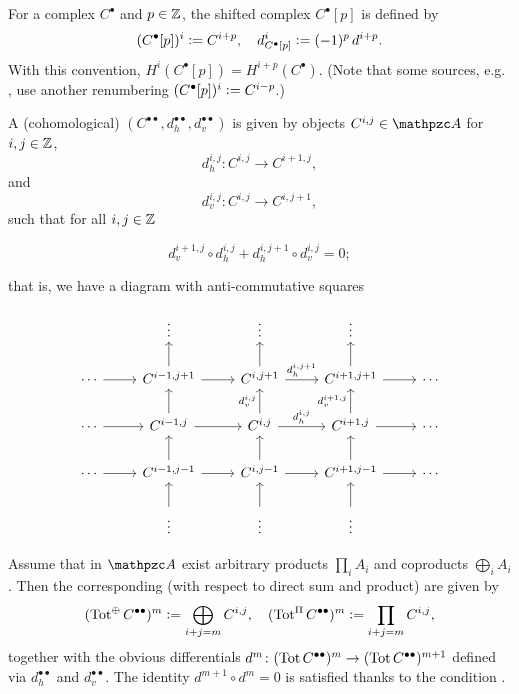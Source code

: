 For a complex $C^\bullet$ and $p\in\mathbb{Z}$, the shifted complex $C^\bullet [p]$ is
defined by
$$(C^\bullet [p])^i \mathrel{\mathop:}= C^{i+p}, \quad d^i_{C^\bullet [p]} \mathrel{\mathop:}= (-1)^p \, d^{i+p}.$$
With this convention, $H^i (C^\bullet [p]) = H^{i+p} (C^\bullet)$. (Note that
some sources, e.g. \cite[1.2.4]{Weibel-94}, use another renumbering
$(C^\bullet [p])^i \mathrel{\mathop:}= C^{i-p}$.)

\begin{definition}
  \label{dfn:double-complex}
  A (cohomological) 
  $(C^{\bullet\bullet}, d_h^{\bullet\bullet}, d_v^{\bullet\bullet})$ is given by
  objects $C^{i,j}\in \vcateg{A}$ for $i,j\in\mathbb{Z}$,
  $$d_h^{i,j}\colon C^{i,j}\to C^{i+1,j},$$
  and 
  $$d_v^{i,j}\colon C^{i,j}\to C^{i,j+1},$$
  such that for all $i,j\in\mathbb{Z}$

  \begin{equation}
    \label{eqn:anticommutativity-in-double-complex}
    d_v^{i+1,j}\circ d_h^{i,j} + d_h^{i,j+1}\circ d_v^{i,j} = 0;
  \end{equation}

  \noindent that is, we have a diagram with anti-commutative squares

  \[ \begin{tikzcd}
      & \vdots & \vdots & \vdots \\
      \cdots\ar{r} & C^{i-1,j+1}\ar{r}\ar{u} & C^{i,j+1}\ar{r}{d_h^{i,j+1}}\ar{u} & C^{i+1,j+1}\ar{r}\ar{u} & \cdots \\
      \cdots\ar{r} & C^{i-1,j}\ar{r}\ar{u} & C^{i,j}\ar{r}{d_h^{i,j}}\ar{u}{d_v^{i,j}} & C^{i+1,j}\ar{r}\ar{u}{d_v^{i+1,j}} & \cdots \\
      \cdots\ar{r} & C^{i-1,j-1}\ar{r}\ar{u} & C^{i,j-1}\ar{r}\ar{u} & C^{i+1,j-1}\ar{r}\ar{u} & \cdots \\
      & \vdots\ar{u} & \vdots\ar{u} & \vdots\ar{u}
    \end{tikzcd} \]

  Assume that in $\vcateg{A}$ exist arbitrary products $\prod_i A_i$ and
  coproducts $\bigoplus_i A_i$. Then the corresponding 
  (with respect to direct sum and product) are given by
  \[ (\operatorname{Tot}^\oplus C^{\bullet\bullet})^m \mathrel{\mathop:}= \bigoplus_{i+j = m} C^{i,j},
    \quad
    (\operatorname{Tot}^\Pi C^{\bullet\bullet})^m \mathrel{\mathop:}= \prod_{i+j = m} C^{i,j}, \]
  together with the obvious differentials
  $d^m\colon (\operatorname{Tot} C^{\bullet\bullet})^m \to (\operatorname{Tot} C^{\bullet\bullet})^{m+1}$
  defined via $d_h^{\bullet\bullet}$ and $d_v^{\bullet\bullet}$. The identity
  $d^{m+1}\circ d^m = 0$ is satisfied thanks to the condition
  .
\end{definition}

